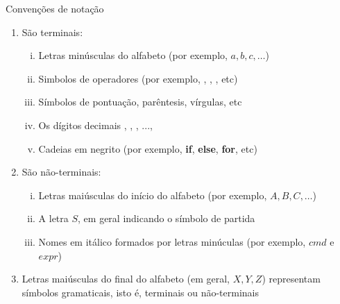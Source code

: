 \begin{frame}[fragile]{Convenções de notação}

    \begin{enumerate}
        \item São terminais:
            \begin{enumerate}[(i)]
                \item Letras minúsculas do alfabeto (por exemplo, $a, b, c, \ldots$)
                \item Simbolos de operadores (por exemplo, , , , etc)
                \item Símbolos de pontuação, parêntesis, vírgulas, etc
                \item Os dígitos decimais , , , ..., 
                \item Cadeias em negrito (por exemplo, \textbf{if}, \textbf{else}, \textbf{for}, etc)
            \end{enumerate}

        \item São não-terminais:
            \begin{enumerate}[(i)]
                \item Letras maiúsculas do início do alfabeto (por exemplo, $A, B, C, \ldots$)
                \item A letra $S$, em geral indicando o símbolo de partida
                \item Nomes em itálico formados por letras minúculas (por exemplo, $cmd$ e $expr$)
            \end{enumerate}

        \item Letras maiúsculas do final do alfabeto (em geral, $X, Y, Z$) representam símbolos gramaticais, isto é, terminais ou não-terminais
    \end{enumerate}

\end{frame}

